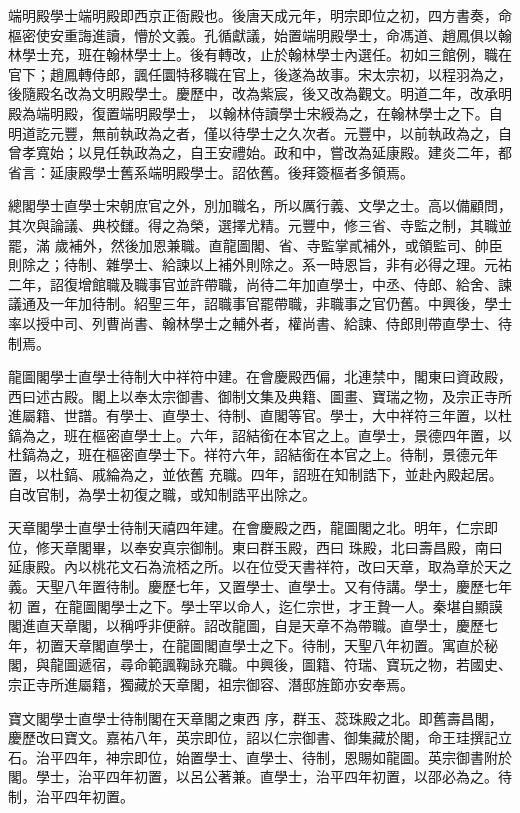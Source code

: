 \begin{pinyinscope}
 端明殿學士端明殿即西京正衙殿也。後唐天成元年，明宗即位之初，四方書奏，命樞密使安重誨進讀，懵於文義。孔循獻議，始置端明殿學士，命馮道、趙鳳俱以翰林學士充，班在翰林學士上。後有轉改，止於翰林學士內選任。初如三館例，職在官下；趙鳳轉侍郎，諷任圜特移職在官上，後遂為故事。宋太宗初，以程羽為之，後隨殿名改為文明殿學士。慶歷中，改為紫宸，後又改為觀文。明道二年，改承明殿為端明殿，復置端明殿學士，
 以翰林侍讀學士宋綬為之，在翰林學士之下。自明道訖元豐，無前執政為之者，僅以待學士之久次者。元豐中，以前執政為之，自曾孝寬始；以見任執政為之，自王安禮始。政和中，嘗改為延康殿。建炎二年，都省言：延康殿學士舊系端明殿學士。詔依舊。後拜簽樞者多領焉。



 總閣學士直學士宋朝庶官之外，別加職名，所以厲行義、文學之士。高以備顧問，其次與論議、典校讎。得之為榮，選擇尤精。元豐中，修三省、寺監之制，其職並罷，滿
 歲補外，然後加恩兼職。直龍圖閣、省、寺監掌貳補外，或領監司、帥臣則除之；待制、雜學士、給諫以上補外則除之。系一時恩旨，非有必得之理。元祐二年，詔復增館職及職事官並許帶職，尚待二年加直學士，中丞、侍郎、給舍、諫議通及一年加待制。紹聖三年，詔職事官罷帶職，非職事之官仍舊。中興後，學士率以授中司、列曹尚書、翰林學士之輔外者，權尚書、給諫、侍郎則帶直學士、待制焉。



 龍圖閣學士直學士待制大中祥符中建。在會慶殿西偏，北連禁中，閣東曰資政殿，西曰述古殿。閣上以奉太宗御書、御制文集及典籍、圖畫、寶瑞之物，及宗正寺所進屬籍、世譜。有學士、直學士、待制、直閣等官。學士，大中祥符三年置，以杜鎬為之，班在樞密直學士上。六年，詔結銜在本官之上。直學士，景德四年置，以杜鎬為之，班在樞密直學士下。祥符六年，詔結銜在本官之上。待制，景德元年置，以杜鎬、戚綸為之，並依舊
 充職。四年，詔班在知制誥下，並赴內殿起居。自改官制，為學士初復之職，或知制誥平出除之。


天章閣學士直學士待制天禧四年建。在會慶殿之西，龍圖閣之北。明年，仁宗即位，修天章閣畢，以奉安真宗御制。東曰群玉殿，西曰
 珠殿，北曰壽昌殿，南曰延康殿。內以桃花文石為流桮之所。以在位受天書祥符，改曰天章，取為章於天之義。天聖八年置待制。慶歷七年，又置學士、直學士。又有侍講。學士，慶歷七年初
 置，在龍圖閣學士之下。學士罕以命人，迄仁宗世，才王贄一人。秦堪自顯謨閣進直天章閣，以稱呼非便辭。詔改龍圖，自是天章不為帶職。直學士，慶歷七年，初置天章閣直學士，在龍圖閣直學士之下。待制，天聖八年初置。寓直於秘閣，與龍圖遞宿，尋命範諷鞠詠充職。中興後，圖籍、符瑞、寶玩之物，若國史、宗正寺所進屬籍，獨藏於天章閣，祖宗御容、潛邸旌節亦安奉焉。



 寶文閣學士直學士待制閣在天章閣之東西
 序，群玉、蕊珠殿之北。即舊壽昌閣，慶歷改曰寶文。嘉祐八年，英宗即位，詔以仁宗御書、御集藏於閣，命王珪撰記立石。治平四年，神宗即位，始置學士、直學士、待制，恩賜如龍圖。英宗御書附於閣。學士，治平四年初置，以呂公著兼。直學士，治平四年初置，以邵必為之。待制，治平四年初置。




\end{pinyinscope}
